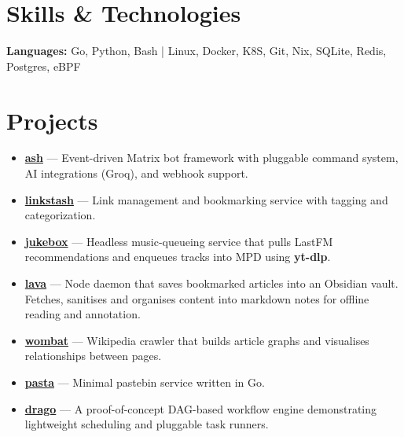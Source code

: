 \documentclass[a4,10pt]{article}
\begin{document}
\section{Skills \& Technologies}

\textbf{Languages:} Go, Python, Bash | Linux, Docker, K8S, Git, Nix, SQLite, Redis, Postgres, eBPF

\section{Projects}
\begin{small}
\begin{itemize}[nolistsep, nosep, partopsep=0pt, leftmargin=1.2em, labelsep=0.6em, itemsep=0pt, topsep=0pt, parsep=0pt]
	\item \textbf{\href{https://github.com/polarhive/ash}{ash}} --- Event-driven Matrix bot framework with pluggable command system, AI integrations (Groq), and webhook support.
	\item \textbf{\href{https://github.com/polarhive/linkstash}{linkstash}} --- Link management and bookmarking service with tagging and categorization.
	\item \textbf{\href{https://github.com/polarhive/jukebox}{jukebox}} --- Headless music-queueing service that pulls LastFM recommendations and enqueues tracks into MPD using \textbf{yt-dlp}.
	\item \textbf{\href{https://polarhive.net/lava}{lava}} --- Node daemon that saves bookmarked articles into an Obsidian vault. Fetches, sanitises and organises content into markdown notes for offline reading and annotation.
	\item \textbf{\href{https://github.com/polarhive/wombat}{wombat}} --- Wikipedia crawler that builds article graphs and visualises relationships between pages.
	\item \textbf{\href{https://polarhive.net/pasta}{pasta}} --- Minimal pastebin service written in Go.
	\item \textbf{\href{https://github.com/polarhive/drago}{drago}} --- A proof-of-concept DAG-based workflow engine demonstrating lightweight scheduling and pluggable task runners.
\end{itemize}
\end{small}
\end{document}
